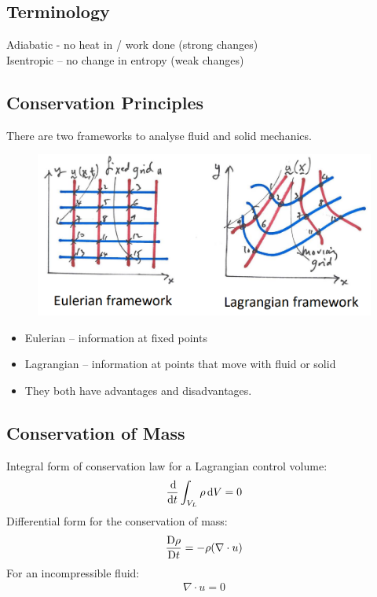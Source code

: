 \documentclass[class=report, crop=false, 12pt,a4paper]{standalone}
\begin{document}
\subsection{Terminology}
Adiabatic - no heat in / work done (strong changes) \\
Isentropic – no change in entropy (weak changes)
\subsection{Conservation Principles}
There are two frameworks to analyse fluid and solid mechanics.
\begin{figure}[H]
    \centering
    \includegraphics[width = 0.8 \textwidth]{../img/diagram2.PNG} 
    \caption{}
\end{figure}
\begin{itemize}[noitemsep]
    \item Eulerian – information at fixed points
    \item Lagrangian – information at points that move with fluid or solid
    \item They both have advantages and disadvantages.
\end{itemize}
\subsection{Conservation of Mass}Integral form of conservation law for a Lagrangian control volume: 
\begin{gather}
    \frac{\dif}{\dif t}\int_{V_L} \rho \dif V = 0
\end{gather}
Differential form for the conservation of mass: 
\begin{gather}
    \frac{\Dif \rho}{\Dif t} = -\rho(\nabla \cdot u)
\end{gather}
For an incompressible fluid: 
\begin{gather}
    \nabla \cdot u = 0
\end{gather}
\end{document}
